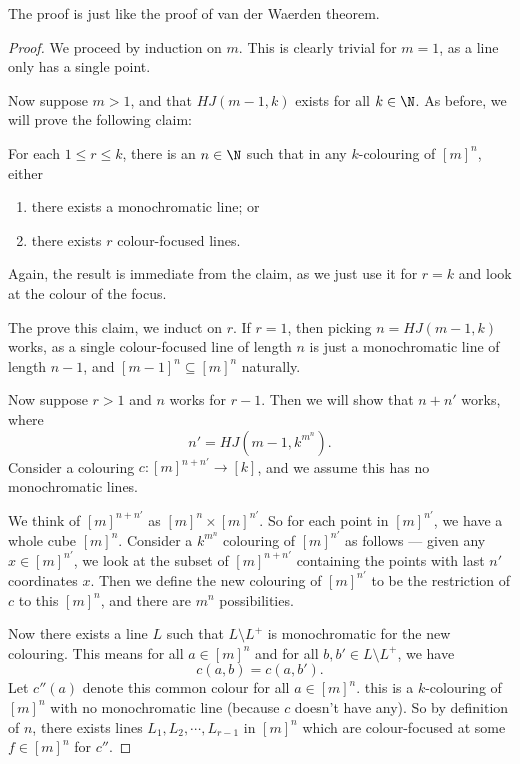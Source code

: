 \documentclass[a4paper]{article}
\begin{document}
The proof is just like the proof of van der Waerden theorem.
\begin{proof}
  We proceed by induction on $m$. This is clearly trivial for $m = 1$, as a line only has a single point.

  Now suppose $m > 1$, and that $HJ(m - 1, k)$ exists for all $k \in \N$. As before, we will prove the following claim:
  \begin{claim}
    For each $1 \leq r \leq k$, there is an $n \in \N$ such that in any $k$-colouring of $[m]^n$, either
    \begin{enumerate}
      \item there exists a monochromatic line; or
      \item there exists $r$ colour-focused lines.
    \end{enumerate}
  \end{claim}
  Again, the result is immediate from the claim, as we just use it for $r = k$ and look at the colour of the focus.

  The prove this claim, we induct on $r$. If $r = 1$, then picking $n = HJ(m - 1, k)$ works, as a single colour-focused line of length $n$ is just a monochromatic line of length $n - 1$, and $[m - 1]^n \subseteq [m]^n$ naturally.

  Now suppose $r > 1$ and $n$ works for $r - 1$. Then we will show that $n + n'$ works, where
  \[
    n' = HJ(m - 1, k^{m^n}).
  \]
  Consider a colouring $c: [m]^{n + n'} \to [k]$, and we assume this has no monochromatic lines.

  We think of $[m]^{n + n'}$ as $[m]^n \times [m]^{n'}$. So for each point in $[m]^{n'}$, we have a whole cube $[m]^n$. Consider a $k^{m^n}$ colouring of $[m]^{n'}$ as follows --- given any $x \in [m]^{n'}$, we look at the subset of $[m]^{n + n'}$ containing the points with last $n'$ coordinates $x$. Then we define the new colouring of $[m]^{n'}$ to be the restriction of $c$ to this $[m]^n$, and there are $m^n$ possibilities.

  Now there exists a line $L$ such that $L \setminus L^+$ is monochromatic for the new colouring. This means for all $a \in [m]^n$ and for all $b, b' \in L\setminus L^+$, we have
  \[
    c(a, b) = c(a, b').
  \]
  Let $c''(a)$ denote this common colour for all $a \in [m]^n$. this is a $k$-colouring of $[m]^n$ with no monochromatic line (because $c$ doesn't have any). So by definition of $n$, there exists lines $L_1, L_2, \cdots, L_{r - 1}$ in $[m]^n$ which are colour-focused at some $f \in [m]^n$ for $c''$.


\end{proof}
\end{document}
